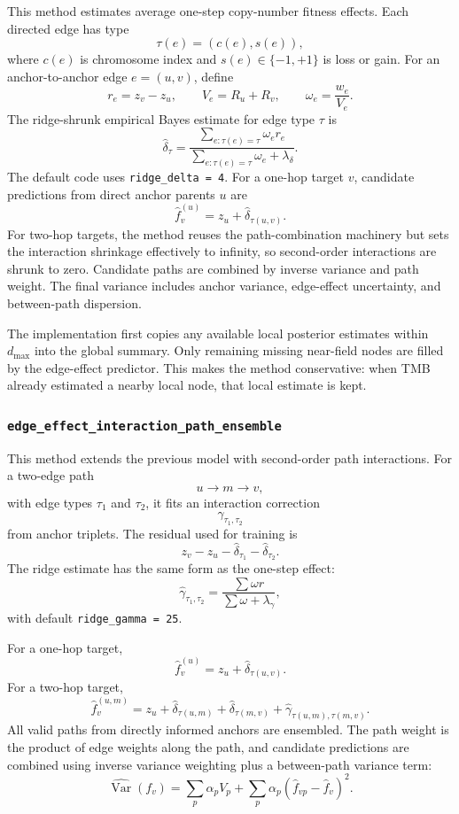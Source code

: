\documentclass[11pt]{article}
\newcommand{\Var}{\operatorname{Var}}
\begin{document}
This method estimates average one-step copy-number fitness effects. Each
directed edge has type
\[
  \tau(e)=(c(e),s(e)),
\]
where $c(e)$ is chromosome index and $s(e)\in\{-1,+1\}$ is loss or gain. For an
anchor-to-anchor edge $e=(u,v)$, define
\[
  r_e=z_v-z_u,\qquad
  V_e=R_u+R_v,\qquad
  \omega_e=\frac{w_e}{V_e}.
\]
The ridge-shrunk empirical Bayes estimate for edge type $\tau$ is
\[
  \hat\delta_{\tau}
  =
  \frac{\sum_{e:\tau(e)=\tau}\omega_e r_e}
       {\sum_{e:\tau(e)=\tau}\omega_e+\lambda_\delta}.
\]
The default code uses \texttt{ridge\_delta = 4}. For a one-hop target $v$,
candidate predictions from direct anchor parents $u$ are
\[
  \hat f_v^{(u)}
  =
  z_u+\hat\delta_{\tau(u,v)}.
\]
For two-hop targets, the method reuses the path-combination machinery but sets
the interaction shrinkage effectively to infinity, so second-order interactions
are shrunk to zero. Candidate paths are combined by inverse variance and path
weight. The final variance includes anchor variance, edge-effect uncertainty,
and between-path dispersion.

The implementation first copies any available local posterior estimates within
$d_{\max}$ into the global summary. Only remaining missing near-field nodes are
filled by the edge-effect predictor. This makes the method conservative: when
TMB already estimated a nearby local node, that local estimate is kept.

\subsubsection{\texttt{edge\_effect\_interaction\_path\_ensemble}}

This method extends the previous model with second-order path interactions.
For a two-edge path
\[
  u\to m\to v,
\]
with edge types $\tau_1$ and $\tau_2$, it fits an interaction correction
\[
  \gamma_{\tau_1,\tau_2}
\]
from anchor triplets. The residual used for training is
\[
  z_v-z_u-\hat\delta_{\tau_1}-\hat\delta_{\tau_2}.
\]
The ridge estimate has the same form as the one-step effect:
\[
  \hat\gamma_{\tau_1,\tau_2}
  =
  \frac{\sum \omega r}
       {\sum \omega+\lambda_\gamma},
\]
with default \texttt{ridge\_gamma = 25}.

For a one-hop target,
\[
  \hat f_v^{(u)}=z_u+\hat\delta_{\tau(u,v)}.
\]
For a two-hop target,
\[
  \hat f_v^{(u,m)}
  =
  z_u+\hat\delta_{\tau(u,m)}
      +\hat\delta_{\tau(m,v)}
      +\hat\gamma_{\tau(u,m),\tau(m,v)}.
\]
All valid paths from directly informed anchors are ensembled. The path weight is
the product of edge weights along the path, and candidate predictions are
combined using inverse variance weighting plus a between-path variance term:
\[
  \widehat{\Var}(f_v)
  =
  \sum_p \alpha_p V_p
  +
  \sum_p \alpha_p(\hat f_{vp}-\hat f_v)^2.
\]
\end{document}
